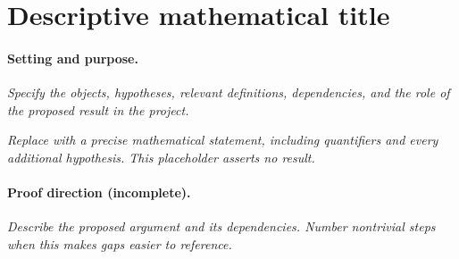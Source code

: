 
\section{Descriptive mathematical title}\label{sec:prefix-001}

\paragraph{Setting and purpose.}
\emph{Specify the objects, hypotheses, relevant definitions, dependencies,
and the role of the proposed result in the project.}

\begin{conjecture}\label{res:prefix-001}
\emph{Replace with a precise mathematical statement, including quantifiers
and every additional hypothesis. This placeholder asserts no result.}
\end{conjecture}

\paragraph{Proof direction (incomplete).}
\emph{Describe the proposed argument and its dependencies. Number nontrivial
steps when this makes gaps easier to reference.}

